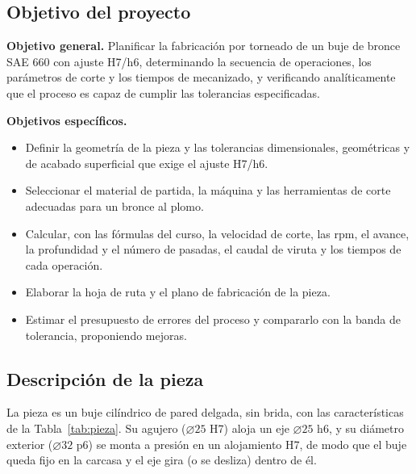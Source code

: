 \documentclass[12pt,a4paper]{article}
\begin{document}
\subsection{Objetivo del proyecto}

\textbf{Objetivo general.} Planificar la fabricación por torneado de un buje de
bronce SAE 660 con ajuste H7/h6, determinando la secuencia de operaciones, los
parámetros de corte y los tiempos de mecanizado, y verificando analíticamente
que el proceso es capaz de cumplir las tolerancias especificadas.

\textbf{Objetivos específicos.}
\begin{itemize}
	\item Definir la geometría de la pieza y las tolerancias dimensionales,
	      geométricas y de acabado superficial que exige el ajuste H7/h6.
	\item Seleccionar el material de partida, la máquina y las herramientas de
	      corte adecuadas para un bronce al plomo.
	\item Calcular, con las fórmulas del curso, la velocidad de corte, las rpm,
	      el avance, la profundidad y el número de pasadas, el caudal de viruta y
	      los tiempos de cada operación.
	\item Elaborar la hoja de ruta y el plano de fabricación de la pieza.
	\item Estimar el presupuesto de errores del proceso y compararlo con la banda
	      de tolerancia, proponiendo mejoras.
\end{itemize}

\subsection{Descripción de la pieza}

La pieza es un buje cilíndrico de pared delgada, sin brida, con las
características de la Tabla~\ref{tab:pieza}. Su agujero ($\varnothing 25$ H7)
aloja un eje $\varnothing 25$ h6, y su diámetro exterior ($\varnothing 32$ p6)
se monta a presión en un alojamiento H7, de modo que el buje queda fijo en la
carcasa y el eje gira (o se desliza) dentro de él.
\end{document}
